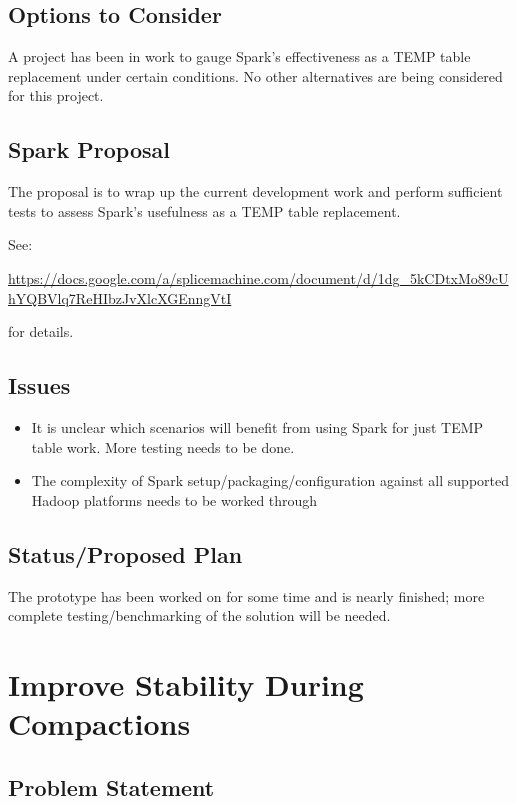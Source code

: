 \documentclass{article}
\begin{document}
\subsection{Options to Consider}

A project has been in work to gauge Spark's effectiveness as a TEMP table replacement under certain conditions.  No other alternatives are being considered for this project. 

\subsection{Spark Proposal}

The proposal is to wrap up the current development work and perform sufficient tests to assess Spark's usefulness as a TEMP table replacement.

\begin{sloppypar}
See:

 \url{https://docs.google.com/a/splicemachine.com/document/d/1dg_5kCDtxMo89cUhYQBVlq7ReHIbzJvXlcXGEnngVtI} 
 
 for details.
\end{sloppypar}

\subsection{Issues}

\begin{itemize}
	\item It is unclear which scenarios will benefit from using Spark for just TEMP table work.  More testing needs to be done.
	\item The complexity of Spark setup/packaging/configuration against all supported Hadoop platforms needs to be worked through
\end{itemize}

\subsection{Status/Proposed Plan}

The prototype has been worked on for some time and is nearly finished; more complete testing/benchmarking of the solution will be needed.

\section{Improve Stability During Compactions}

\subsection{Problem Statement}
\end{document}
